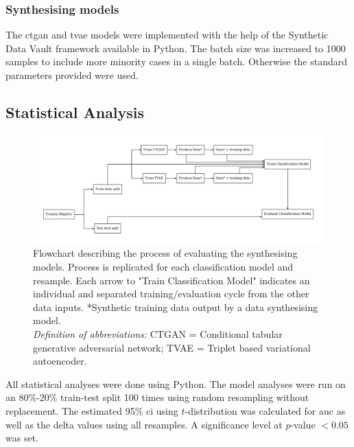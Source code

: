 \documentclass[12pt, letterpaper]{article}
\begin{document}
\subsubsection*{Synthesising models}
The \acrfull{ctgan} \cite{xu_modeling_2019} and \acrfull{tvae} \cite{ishfaq_tvae_2018} models were implemented with the help of the Synthetic Data Vault framework \cite{patki_sdv_2016} available in Python. The batch size was increased to 1000 samples to include more minority cases in a single batch. Otherwise the standard parameters provided were used.

\subsection{Statistical Analysis}
\begin{figure}[h]
    \centering
    \includegraphics[width=\textwidth]{figures/model_flowchart.pdf}
    \caption{Flowchart describing the process of evaluating the synthesising models. Process is replicated for each classification model and resample. Each arrow to "Train Classification Model" indicates an individual and separated training/evaluation cycle from the other data inputs. *Synthetic training data output by a data synthesising model.\\ \textit{Definition of abbreviations:} CTGAN = Conditional tabular generative adversarial network; TVAE = Triplet based variational autoencoder.}
    \label{fig:modelflowchart}
\end{figure}

All statistical analyses were done using Python. The model analyses were run on an 80\%-20\% train-test split 100 times using random resampling without replacement. The estimated 95\% \acrfull{ci} using $t$-distribution was calculated for \acrshort{auc} as well as the delta values using all resamples. A significance level at $p$-value $< 0.05$ was set.
\end{document}
